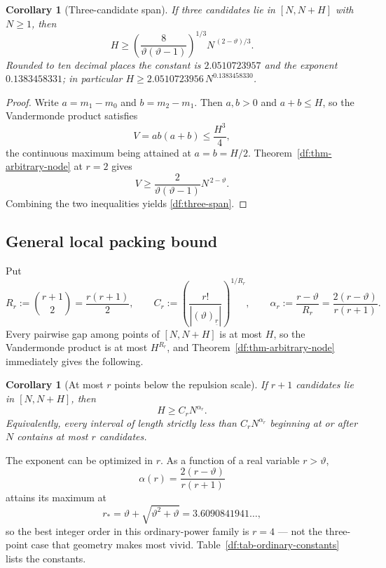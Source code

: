 \documentclass[11pt,oneside]{article}
\newtheorem{corollary}[theorem]{Corollary}
\theoremstyle{definition}
\theoremstyle{remark}
\newcommand{\thetaq}{\vartheta}
\newcommand{\fall}[2]{\left(#1\right)_{\!\underline{#2}}}
\begin{document}
\begin{corollary}[Three-candidate span]
\label{df:cor-three-span}
If three candidates lie in $[N,N+H]$ with $N\ge1$, then
\begin{equation}
 H\ge\left(\frac{8}{\thetaq(\thetaq-1)}\right)^{1/3}N^{\,(2-\thetaq)/3}.
\label{df:three-span}
\end{equation}
Rounded to ten decimal places the constant is $2.0510723957$ and the exponent
$0.1383458331$; in particular $H\ge2.0510723956\,N^{0.1383458330}$.
\end{corollary}

\begin{proof}
Write $a=m_1-m_0$ and $b=m_2-m_1$.  Then $a,b>0$ and $a+b\le H$, so the Vandermonde product
satisfies
\[
 V=ab(a+b)\le\frac{H^{3}}{4},
\]
the continuous maximum being attained at $a=b=H/2$.  Theorem~\ref{df:thm-arbitrary-node} at
$r=2$ gives
\[
 V\ge\frac{2}{\thetaq(\thetaq-1)}N^{\,2-\thetaq}.
\]
Combining the two inequalities yields \eqref{df:three-span}.
\end{proof}

\subsection{General local packing bound}

Put
\[
 R_r:=\binom{r+1}{2}=\frac{r(r+1)}{2},
 \qquad
 C_r:=\left(\frac{r!}{|\fall{\thetaq}{r}|}\right)^{1/R_r},
 \qquad
 \alpha_r:=\frac{r-\thetaq}{R_r}=\frac{2(r-\thetaq)}{r(r+1)}.
\]
Every pairwise gap among points of $[N,N+H]$ is at most $H$, so the Vandermonde product is at
most $H^{R_r}$, and Theorem~\ref{df:thm-arbitrary-node} immediately gives the following.

\begin{corollary}[At most $r$ points below the repulsion scale]
\label{df:cor-r-packing}
If $r+1$ candidates lie in $[N,N+H]$, then
\begin{equation}
 H\ge C_rN^{\alpha_r}.
\label{df:r-span}
\end{equation}
Equivalently, every interval of length strictly less than $C_rN^{\alpha_r}$ beginning at or
after $N$ contains at most $r$ candidates.
\end{corollary}

The exponent can be optimized in $r$.  As a function of a real variable $r>\thetaq$,
\[
 \alpha(r)=\frac{2(r-\thetaq)}{r(r+1)}
\]
attains its maximum at
\[
 r_{\ast}=\thetaq+\sqrt{\thetaq^{2}+\thetaq}=3.6090841941\ldots,
\]
so the best integer order in this ordinary-power family is $r=4$ --- not the three-point case
that geometry makes most vivid.  Table~\ref{df:tab-ordinary-constants} lists the constants.
\end{document}
